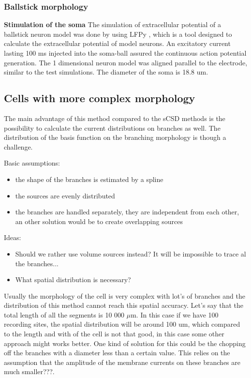\documentclass[12pt,a4paper]{article}
\begin{document}
\subsubsection{Ballstick morphology}


\textbf{Stimulation of the soma}
The simulation of extracellular potential of a ballstick neuron model was done by using LFPy \cite{LFPy}, which is a tool designed to calculate the extracellular potential of model neurons. An excitatory current lasting 100 ms injected into the soma-ball assured the continuous action potential generation.  The 1 dimensional neuron model was aligned parallel to the electrode, similar to the test simulations. The diameter of the soma is 18.8 um. 



\subsection{Cells with more complex morphology}
The main advantage of this method compared to the sCSD methods is the possibility to calculate the current distributions on branches as well. The distribution of the basis function on the branching morphology is though a challenge.

Basic assumptions:
\begin{itemize}
\item the shape of the branches is estimated by a spline
\item the sources are evenly distributed
\item the branches are handled separately, they are independent from each other, an other solution would be to create overlapping sources
\end{itemize}

Ideas:
\begin{itemize}
\item Should we rather use volume sources instead? It will be impossible to trace al the branches...
\item What spatial distribution is necessary? 
\end{itemize}

Usually the morphology of the cell is very complex with lot's  of branches and the distribution of this method cannot reach this spatial accuracy. Let's say that the total length of all the segments is 10 000 $\mu$m. In this case if we have 100 recording sites, the spatial distribution will be around 100 um, which compared to the length and with of the cell is not that good, in this case some other approach might works better. One kind of solution for this could be the chopping off the branches with a diameter less than a certain value. This relies on the assumption that the amplitude of the membrane currents on these branches are much smaller???.
\end{document}

